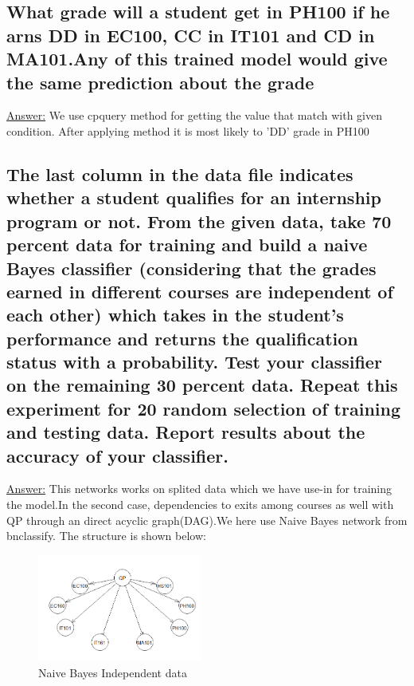 \documentclass[15pt,journal]{IEEEtran}
\begin{document}
\subsection{What grade will a student get in PH100 if he arns DD in EC100, CC in IT101 and CD in MA101.Any of this trained model would give the same prediction about the grade}
\underline{Answer:}
We use cpquery method for getting the value that match with given condition. After applying method it is most likely to 'DD' grade in PH100

\subsection{The last column in the data file indicates whether a student qualifies for an internship program or not. From the given data, take 70 percent data for training and build a naive Bayes classifier (considering that the grades earned in different courses are independent of each other) which takes in the student’s performance and returns the qualification status with a probability. Test your classifier on the remaining 30 percent data. Repeat this experiment for 20 random selection of training and testing data. Report results about the accuracy of your classifier.}

\underline{Answer:}
This networks works on splited data which we have use-in for training the model.In the second case, dependencies to exits among courses as well with QP through an direct acyclic graph(DAG).We here use Naive Bayes network from bnclassify. The structure is shown below:
\begin{figure}[H]%
\begin {center}
\includegraphics[width=0.48\textwidth]{images/naive (2).png}
\caption{Naive Bayes Independent data} %
\label{fig:ecg}
\end {center}
\end{figure}
\end{document}
